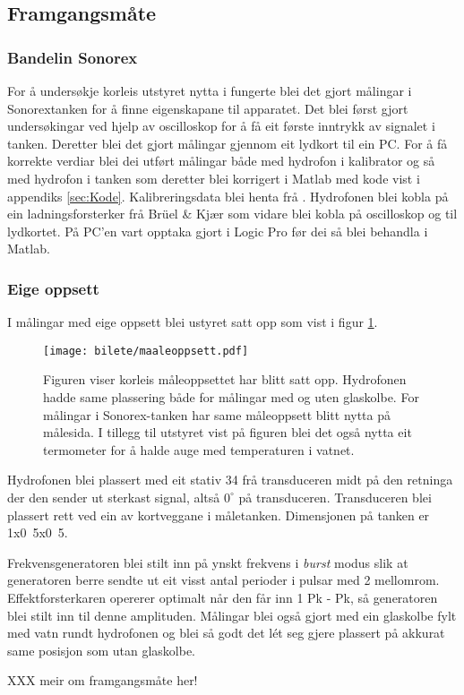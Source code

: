 \subsection{Framgangsmåte}
\subsubsection*{Bandelin Sonorex}
For å undersøkje korleis utstyret nytta i \cite{ultraprotese} fungerte blei det gjort målingar i Sonorextanken for å finne eigenskapane til apparatet. Det blei først gjort undersøkingar ved hjelp av oscilloskop for å få eit første inntrykk av signalet i tanken. Deretter blei det gjort målingar gjennom eit lydkort til ein PC. For å få korrekte verdiar blei dei utført målingar både med hydrofon i kalibrator og så med hydrofon i tanken som deretter blei korrigert i Matlab med kode vist i appendiks \ref{sec:Kode}. Kalibreringsdata blei henta frå \cite{calibrator}. Hydrofonen blei kobla på ein ladningsforsterker frå Brüel \& Kjær som vidare blei kobla på oscilloskop og til lydkortet. På PC'en vart opptaka gjort i Logic Pro før dei så blei behandla i Matlab.

\subsubsection*{Eige oppsett}
I målingar med eige oppsett blei ustyret satt opp som vist i figur \ref{fig:maaleoppsett}.

\begin{figure}[htbp]
	\centering
  	\texttt{[image: bilete/maaleoppsett.pdf]}
  	\caption[Måleoppsett]{Figuren viser korleis måleoppsettet har blitt satt opp. Hydrofonen hadde same plassering både for målingar med og uten glaskolbe. 	For målingar i Sonorex-tanken har same måleoppsett blitt nytta på målesida. I tillegg til utstyret vist på figuren blei det også nytta eit termometer for å halde 	auge med temperaturen i vatnet.}
  	\label{fig:maaleoppsett}
\end{figure}

Hydrofonen blei plassert med eit stativ \unit{34}{\centi\metre} frå transduceren midt på den retninga der den sender ut sterkast signal, altså ${0}^\circ$ på transduceren. Transduceren blei plassert rett ved ein av kortveggane i måletanken. Dimensjonen på tanken er \unit{1x0.5x0.5}{\metre}.

Frekvensgeneratoren blei stilt inn på ynskt frekvens i \emph{burst} modus slik at generatoren berre sendte ut eit visst antal perioder i pulsar med \unit{2}{\second} mellomrom. Effektforsterkaren opererer optimalt når den får inn \unit{1}{\volt} Pk - Pk, så generatoren blei stilt inn til denne amplituden. Målingar blei også gjort med ein glaskolbe fylt med vatn rundt hydrofonen og blei så godt det lét seg gjere plassert på akkurat same posisjon som utan glaskolbe.

XXX meir om framgangsmåte her!
